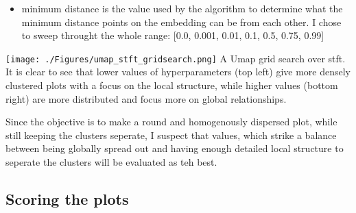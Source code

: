 \documentclass[11pt]{article}
\begin{document}
\begin{itemize}
\begin{itemize}
\item minimum distance is the value used by the algorithm to determine what the minimum distance points on the embedding can be from each other. I chose to sweep throught the whole range: [0.0, 0.001, 0.01, 0.1, 0.5, 0.75, 0.99]
\end{itemize}
\end{itemize}

\begin{center}
\texttt{[image: ./Figures/umap\_stft\_gridsearch.png]}
A Umap grid search over stft.\\ It is clear to see that lower values of hyperparameters (top left) give more densely clustered plots with a focus on the local structure, while higher values (bottom right) are more distributed and focus more on global relationships.
\end{center}




Since the objective is to make a round and homogenously dispersed plot, while still keeping the clusters seperate, I suspect that values, which strike a balance between being globally spread out and having enough detailed local structure to seperate the clusters will be evaluated as teh best.

\subsection{Scoring the plots}
\label{sec:orgf929bf6}
\end{document}
